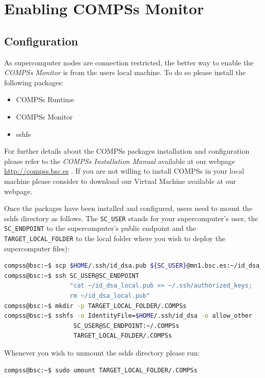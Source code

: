 \section{Enabling COMPSs Monitor}
\label{sec:Monitor}

\subsection{Configuration}

As supercomputer nodes are connection restricted, the better way to enable the \textit{COMPSs Monitor} is from the users local machine. 
To do so please install the following packages:
\begin{itemize}
 \item COMPSs Runtime
 \item COMPSs Monitor
 \item sshfs
\end{itemize}

For further details about the COMPSs packages installation and configuration please refer to the \textit{COMPSs Installation Manual} 
available at our webpage \url{http://compss.bsc.es} . If you are not willing to install COMPSs in your local machine please consider
to download our Virtual Machine available at our webpage. 
\newline

Once the packages have been installed and configured, users need to mount the sshfs directory as follows. The \verb|SC_USER| stands for 
your supercomputer's user, the \verb|SC_ENDPOINT| to the supercomputer's public endpoint and the \verb|TARGET_LOCAL_FOLDER| to 
the local folder where you wish to deploy the supercomputer files):

\begin{lstlisting}[language=bash]
compss@bsc:~$ scp $HOME/.ssh/id_dsa.pub ${SC_USER}@mn1.bsc.es:~/id_dsa_local.pub
compss@bsc:~$ ssh SC_USER@SC_ENDPOINT 
                  "cat ~/id_dsa_local.pub >> ~/.ssh/authorized_keys; 
                  rm ~/id_dsa_local.pub"
compss@bsc:~$ mkdir -p TARGET_LOCAL_FOLDER/.COMPSs
compss@bsc:~$ sshfs -o IdentityFile=$HOME/.ssh/id_dsa -o allow_other 
                   SC_USER@SC_ENDPOINT:~/.COMPSs 
                   TARGET_LOCAL_FOLDER/.COMPSs
\end{lstlisting}

Whenever you wish to unmount the sshfs directory please run:

\begin{lstlisting}[language=bash]
compss@bsc:~$ sudo umount TARGET_LOCAL_FOLDER/.COMPSs
\end{lstlisting}


